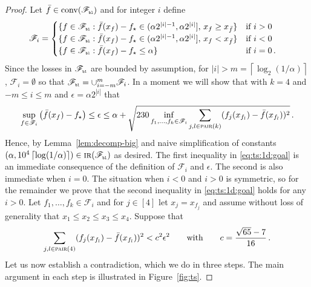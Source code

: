 \documentclass[letter, 12pt]{report}
\newcommand{\pb}{\text{\tiny\texttt{b}}}
\newcommand{\pl}{\text{\tiny\texttt{l}}}
\newcommand{\ceil}[1]{\left\lceil #1 \right\rceil}
\newcommand{\pair}{\operatorname{\textsc{pair}}}
\newcommand{\sF}{\mathscr F}
\newcommand{\conv}{\operatorname{conv}}
\newcommand{\1}{\mathbf{1}}
\newcommand{\IR}{\operatorname{\textsc{ir}}}
\theoremstyle{plain}
\theoremstyle{definition}
\theoremstyle{remark}
\begin{document}
\begin{proof}
    Let $\bar f \in \conv(\sF_{\pb\pl})$ and for integer $i$ define
    \begin{align}
        \sF_i & = \begin{cases}
                      \{f \in \sF_{\pb\pl} : \bar f(x_f) - f_\star \in (\alpha 2^{|i|-1}, \alpha 2^{|i|}],\, x_f \geq x_{\bar f}\} & \text{if } i > 0     \\
                      \{f \in \sF_{\pb\pl} : \bar f(x_f) - f_\star \in (\alpha 2^{|i|-1}, \alpha 2^{|i|}],\, x_f < x_{\bar f}\}    & \text{if } i < 0     \\
                      \{f \in \sF_{\pb\pl} : \bar f(x_f) - f_\star \leq \alpha \}                                                  & \text{if } i = 0 \,.
                  \end{cases}
    \end{align}
    Since the losses in $\sF_{\pb\pl}$ are bounded by assumption, for $|i| > m = \ceil{\log_2(1/\alpha)}$, $\sF_i = \emptyset$
    so that $\sF_{\pb\pl} = \cup_{i=-m}^m \sF_i$.
    In a moment we will show that with $k = 4$ and $-m \leq i \leq m$ and $\epsilon = \alpha 2^{|i|}$ that
    \begin{align}
        \sup_{f \in \sF_i} \left(\bar f(x_f) - f_\star\right)
        \leq \epsilon \leq \alpha + \sqrt{230\inf_{f_1,\ldots,f_k \in \sF_i} \sum_{j,l \in \pair(k)} (f_j(x_{f_l}) - \bar f(x_{f_l}))^2} \,.
        \label{eq:ts:1d:goal}
    \end{align}
    Hence, by Lemma~\ref{lem:decomp-big} and naive simplification of constants $(\alpha, 10^4 \ceil{\log(1/\alpha)}) \in \IR(\sF_{\pb\pl})$ as desired.
    The first inequality in \cref{eq:ts:1d:goal} is an immediate consequence of the definition of $\sF_i$ and $\epsilon$.
    The second is also immediate when $i = 0$.
    The situation when $i < 0$ and $i > 0$ is symmetric, so for the remainder we prove that the second inequality in \cref{eq:ts:1d:goal} holds for any $i > 0$.
    Let $f_1,\ldots,f_k \in \sF_i$ and
    for $j \in [4]$ let $x_j = x_{f_j}$ and assume without loss of generality that $x_1 \leq x_2 \leq x_3 \leq x_4$.
    Suppose that
    \begin{align}
        \sum_{j,l \in \pair(4)} (f_j(x_{f_l}) - \bar f(x_{f_l}))^2 < c^2 \epsilon^2 \qquad\text{with}\qquad c = \frac{\sqrt{65} - 7}{16} \,.
        \label{eq:ts:max}
    \end{align}
    Let us now establish a contradiction, which we do in three steps. The main argument in each step is illustrated in Figure~\ref{fig:ts}.

\end{proof}
\end{document}
